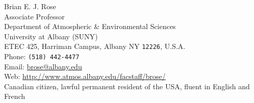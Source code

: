 \documentclass[11pt, letterpaper]{article} %
\begin{document}
\thispagestyle{empty}


{\LARGE Brian E. J. Rose}\\[0.2 cm] %
Associate Professor \\
Department of Atmospheric \& Environmental Sciences \\
University at Albany (SUNY) \\
ETEC 425, Harriman Campus, Albany NY \texttt{12226}, U.S.A.\\[.1cm]
Phone: \texttt{(518) 442-4477}\\ %
Email: \href{mailto:brose@albany.edu}{brose@albany.edu}\\ %
Web: \href{http://www.atmos.albany.edu/facstaff/brose/}{http://www.atmos.albany.edu/facstaff/brose/}\\ [.2cm]%
Canadian citizen, lawful permanent resident of the USA, fluent in English and French








\end{document}
